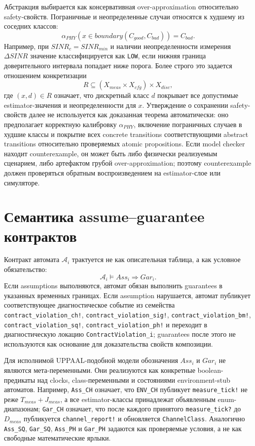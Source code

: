 \documentclass[10pt,a4paper]{article}
\newcommand{\code}[1]{\texttt{#1}}
\newcommand{\A}[1]{\mathcal{A}_{#1}}
\begin{document}
Абстракция выбирается как консервативная over-approximation относительно safety-свойств. Пограничные и неопределенные случаи относятся к худшему из соседних классов:
\begin{equation}
\alpha_{PHY}(x\in boundary(C_{good},C_{bad}))=C_{bad}.
\end{equation}
Например, при \(SINR_c=SINR_{min}\) и наличии неопределенности измерения \(\Delta SINR\) значение классифицируется как \code{LOW}, если нижняя граница доверительного интервала попадает ниже порога. Более строго это задается отношением конкретизации
\begin{equation}
R\subseteq (X_{meas}\times X_{cfg})\times X_{disc},
\end{equation}
где \((x,d)\in R\) означает, что дискретный класс \(d\) покрывает все допустимые estimator-значения и неопределенности для \(x\). Утверждение о сохранении safety-свойств далее не используется как доказанная теорема автоматически: оно предполагает корректную калибровку \(\alpha_{PHY}\), включение пограничных случаев в худшие классы и покрытие всех concrete transitions соответствующими abstract transitions относительно проверяемых atomic propositions. Если model checker находит counterexample, он может быть либо физически реализуемым сценарием, либо артефактом грубой over-approximation; поэтому counterexample должен проверяться обратным воспроизведением на estimator-слое или симуляторе.

\section{Семантика assume--guarantee контрактов}

Контракт автомата \(\A{i}\) трактуется не как описательная таблица, а как условное обязательство:
\begin{equation}
\A{i}\models Ass_i\Rightarrow Gar_i.
\end{equation}
Если assumptions выполняются, автомат обязан выполнить guarantees в указанных временных границах. Если assumption нарушается, автомат публикует соответствующее диагностическое событие из семейства \code{contract\_violation\_ch!}, \code{contract\_violation\_sig!}, \code{contract\_violation\_bm!}, \code{contract\_violation\_sq!}, \code{contract\_violation\_ph!} и переходит в диагностическую локацию \code{ContractViolation\_i}; guarantees после этого не используются как основание для доказательства свойств композиции.

Для исполнимой UPPAAL-подобной модели обозначения \(Ass_i\) и \(Gar_i\) не являются мета-переменными. Они реализуются как конкретные boolean-предикаты над clocks, class-переменными и состояниями environment-stub автоматов. Например, \code{Ass\_CH} означает, что \code{ENV\_CH} публикует \code{measure\_tick!} не реже \(T_{meas}+J_{meas}\), а все estimator-классы принадлежат объявленным enum-диапазонам; \code{Gar\_CH} означает, что после каждого принятого \code{measure\_tick?} до \(D_{meas}\) публикуется \code{channel\_report!} и обновляется \code{ChannelClass}. Аналогично \code{Ass\_SQ}, \code{Gar\_SQ}, \code{Ass\_PH} и \code{Gar\_PH} задаются как проверяемые условия, а не как свободные математические ярлыки.
\end{document}
